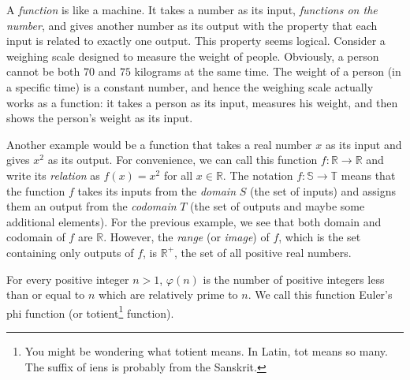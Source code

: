 A \textit{function} is like a machine. It takes a number as its input, \textit{functions on the number}, and gives another number as its output with the property that each input is related to exactly one output. This property seems logical. Consider a weighing scale designed to measure the weight of people. Obviously, a person cannot be both $70$ and $75$ kilograms at the same time. The weight of a person (in a specific time) is a constant number, and hence the weighing scale actually works as a function: it takes a person as its input, measures his weight, and then shows the person's weight as its input.

Another example would be a function that takes a real number $x$ as its input and gives $x^2$ as its output. For convenience, we can call this function $f: \mathbb R \to \mathbb R$ and write its \textit{relation} as $f(x) = x^2$ for all $x \in \mathbb R$. The notation $f: \mathbb S \to \mathbb T$ means that the function $f$ takes its inputs from the \textit{domain} $S$ (the set of inputs) and assigns them an output from the \textit{codomain} $T$ (the set of outputs and maybe some additional elements). For the previous example, we see that both domain and codomain of $f$ are $\mathbb R$. However, the \textit{range} (or \textit{image}) of $f$, which is the set containing only outputs of $f$, is $\mathbb R^{+}$, the set of all positive real numbers.

	\begin{definition}\label{def:totient}
		For every positive integer $n>1$, $\varphi(n)$ is the number of positive integers less than or equal to $n$ which are relatively prime to $n$. We call this function Euler's phi function (or totient\footnote{You might be wondering what {totient} means. In Latin, {tot} means so many. The suffix of {iens} is probably from the Sanskrit.} function).
	\end{definition}

